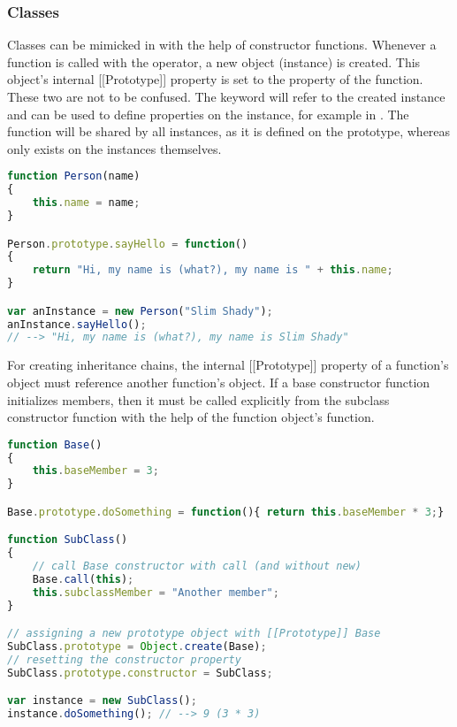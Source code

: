 \subsubsection{Classes}

Classes can be mimicked in  with the help of constructor functions. Whenever a function is called with the  operator, a new object (instance) is created. This object's internal [[Prototype]] property is set to the  property of the function. These two are not to be confused. The  keyword will refer to the created instance and can be used to define properties on the instance, for example  in . The  function will be shared by all instances, as it is defined on the prototype, whereas  only exists on the instances themselves.

\SingleSpacing
\begin{lstlisting}[language=JavaScript, caption=Classes in \myProperName{JavaScript}, label=JSClasses]
function Person(name)
{
	this.name = name;
}

Person.prototype.sayHello = function()
{
	return "Hi, my name is (what?), my name is " + this.name;
}

var anInstance = new Person("Slim Shady");
anInstance.sayHello();
// --> "Hi, my name is (what?), my name is Slim Shady"
\end{lstlisting}
\OnehalfSpacing

For creating inheritance chains, the internal [[Prototype]] property of a function's \linebreak{} object must reference another function's  object. If a base constructor function initializes members, then it must be called explicitly from the subclass constructor function with the help of the function object's  function.

\SingleSpacing
\begin{lstlisting}[language=JavaScript, caption=Prototype-based inheritance in \myProperName{JavaScript}, label=JSClasses]
function Base()
{
	this.baseMember = 3;
}

Base.prototype.doSomething = function(){ return this.baseMember * 3;}

function SubClass()
{
	// call Base constructor with call (and without new)
	Base.call(this);
	this.subclassMember = "Another member";
}

// assigning a new prototype object with [[Prototype]] Base
SubClass.prototype = Object.create(Base);
// resetting the constructor property
SubClass.prototype.constructor = SubClass;

var instance = new SubClass();
instance.doSomething(); // --> 9 (3 * 3)

\end{lstlisting}
\OnehalfSpacing

